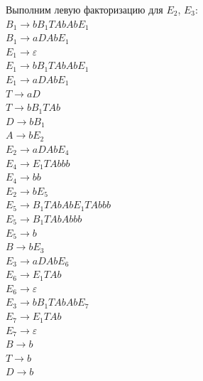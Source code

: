 \documentclass[a4paper,14pt]{extarticle}
\begin{document}
\begin{enumerate}[1.]
Выполним левую факторизацию для $E_2$, $E_3$:\\
$B_1 \rightarrow bB_1TAbAbE_1$\\
$B_1 \rightarrow aDAbE_1$\\
$E_1 \rightarrow \varepsilon$\\
$E_1 \rightarrow bB_1TAbAbE_1$\\
$E_1 \rightarrow aDAbE_1$\\
$T \rightarrow aD$\\ 
$T \rightarrow bB_1TAb$\\
$D \rightarrow bB_1$\\
$A \rightarrow bE_2$\\
$E_2 \rightarrow aDAbE_4$\\
$E_4 \rightarrow E_1TAbbb$\\
$E_4 \rightarrow bb$\\
$E_2 \rightarrow bE_5$\\
$E_5 \rightarrow B_1TAbAbE_1TAbbb$\\
$E_5 \rightarrow B_1TAbAbbb$\\
$E_5 \rightarrow b$\\
$B \rightarrow bE_3$\\ 
$E_3 \rightarrow aDAbE_6$\\ 
$E_6 \rightarrow E_1TAb$\\ 
$E_6 \rightarrow \varepsilon$\\ 
$E_3 \rightarrow bB_1TAbAbE_7$\\
$E_7 \rightarrow E_1TAb$\\
$E_7 \rightarrow \varepsilon$\\
$B \rightarrow b$\\
$T \rightarrow b$\\
$D \rightarrow b$\\


\end{enumerate}
\end{document}
